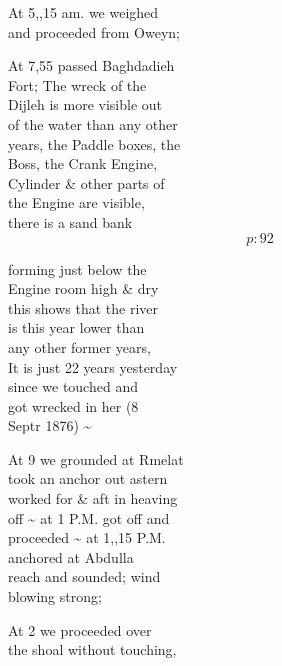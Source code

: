 \documentclass{report}
\begin{document}
	\par{
 	At 5,,15 am. we weighed\ \\and proceeded from Oweyn;\ \\
	}

	\par{
 	At 7,55 passed Baghdadieh\ \\Fort; The wreck of the\ \\Dijleh is more visible out\ \\of the water than any other\ \\years, the Paddle boxes, the\ \\Boss, the Crank Engine,\ \\Cylinder \& other parts of\ \\the Engine are visible,\ \\there is a sand bank\ \\
  \[p: 92 \]

	}


	\par{
 	forming just below the\ \\Engine room high \& dry\ \\this shows that the river\ \\is this year lower than\ \\any other former years,\ \\It is just 22 years yesterday\ \\since we touched and\ \\got wrecked in her (8\ \\Septr 1876) \~{}\ \\
	}

	\par{
 	At 9 we grounded at Rmelat\ \\took an anchor out astern\ \\worked for \& aft in heaving\ \\off \~{} at 1 P.M. got off and\ \\proceeded \~{} at 1,,15 P.M.\ \\anchored at Abdulla\ \\reach and sounded; wind\ \\blowing strong;\ \\
	}

	\par{
 	At 2 we proceeded over\ \\the shoal without touching,\ \\
	}
\end{document}
